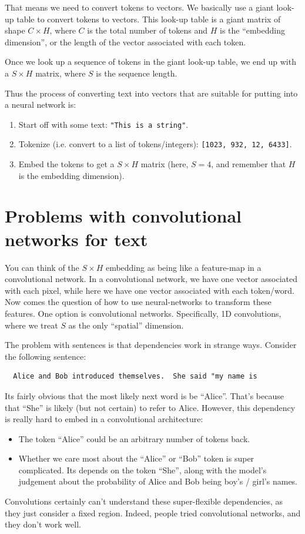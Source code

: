 \documentclass{article}
\begin{document}
That means we need to convert tokens to vectors.
We basically use a giant look-up table to convert tokens to vectors.
This look-up table is a giant matrix of shape $C \times H$, where $C$ is the total number of tokens and $H$ is the ``embedding dimension'', or the length of the vector associated with each token.
 
Once we look up a sequence of tokens in the giant look-up table, we end up with a $S \times H$ matrix, where $S$ is the sequence length.

Thus the process of converting text into vectors that are suitable for putting into a neural network is:
\begin{enumerate}
  \item Start off with some text: \verb|"This is a string"|.
  \item Tokenize (i.e. convert to a list of tokens/integers): \verb|[1023, 932, 12, 6433]|.
  \item Embed the tokens to get a $S\times H$ matrix (here, $S = 4$, and remember that $H$ is the embedding dimension).
\end{enumerate}

\section{Problems with convolutional networks for text}

You can think of the $S \times H$ embedding as being like a feature-map in a convolutional network.
In a convolutional network, we have one vector associated with each pixel, while here we have one vector associated with each token/word.
Now comes the question of how to use neural-networks to transform these features.
One option is convolutional networks.
Specifically, 1D convolutions, where we treat $S$ as the only ``spatial'' dimension.

The problem with sentences is that dependencies work in strange ways.
Consider the following sentence:
\begin{verbatim}
  Alice and Bob introduced themselves.  She said "my name is
\end{verbatim}
Its fairly obvious that the most likely next word is be ``Alice''.
That's because that ``She'' is likely (but not certain) to refer to Alice.
However, this dependency is really hard to embed in a convolutional architecture:
\begin{itemize}
  \item The token ``Alice'' could be an arbitrary number of tokens back.
  \item Whether we care most about the ``Alice'' or ``Bob'' token is super complicated. Its depends on the token ``She'', along with the model's judgement about the probability of Alice and Bob being boy's / girl's names.
\end{itemize}
Convolutions certainly can't understand these super-flexible dependencies, as they just consider a fixed region.
Indeed, people tried convolutional networks, and they don't work well.
\end{document}
